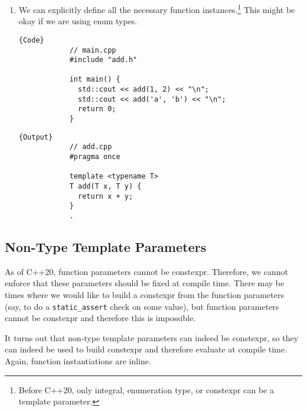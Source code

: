 \documentclass{article}
\begin{document}
\begin{lemma}
\begin{enumerate}
        \item We can explicitly define all the necessary function instances.\footnote{Before C++20, only integral, enumeration type, or constexpr can be a template parameter.} This might be okay if we are using enum types. 

        \noindent\begin{minipage}{.45\textwidth}
          \begin{lstlisting}[]{Code}
            // main.cpp
            #include "add.h"

            int main() {
              std::cout << add(1, 2) << "\n";
              std::cout << add('a', 'b') << "\n";
              return 0;
            }
          \end{lstlisting}
          \end{minipage}
          \hfill
          \begin{minipage}{.44\textwidth}
          \begin{lstlisting}[]{Output}
            // add.cpp
            #pragma once

            template <typename T>
            T add(T x, T y) {
              return x + y;
            }
            .
          \end{lstlisting}
        \end{minipage}
      \end{enumerate}
    \end{lemma}

  \subsection{Non-Type Template Parameters} 

    As of C++20, function parameters cannot be constexpr. Therefore, we cannot enforce that these parameters should be fixed at compile time. There may be times where we would like to build a constexpr from the function parameters (say, to do a \texttt{static\_assert} check on some value), but function parameters cannot be constexpr and therefore this is impossible. 

    \begin{definition}
      It turns out that non-type template parameters can indeed be constexpr, so they can indeed be used to build constexpr and therefore evaluate at compile time. Again, function instantiations are inline. 
    \end{definition}
\end{document}
